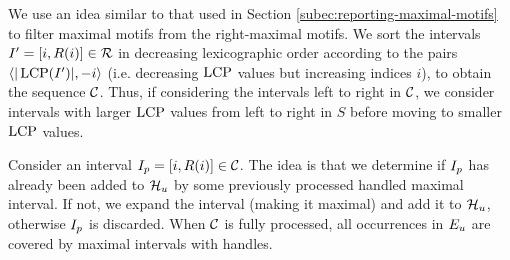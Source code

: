 We use an idea similar to that used in Section \ref{subec:reporting-maximal-motifs} to filter maximal motifs from the right-maximal motifs. 
We sort the intervals $I_{}' = [i, R(i)] \in \mathcal{R}$ in decreasing lexicographic order according to the pairs
$\langle|\operatorname{LCP}(I_{}')|, -i\rangle$ (i.e. decreasing $\operatorname{LCP}$ values but increasing indices $i$), to obtain the sequence $\mathcal{C}$. 
Thus, if considering the intervals left to right in $\mathcal{C}$, we consider intervals with larger $\operatorname{LCP}$ values from left to right in $S$ before moving to smaller $\operatorname{LCP}$ values. 




Consider an interval $I_{p} = [i, R(i)] \in \mathcal{C}$. The idea is that we determine if $I_{p}$ has already been added to $\mathcal{H}_{u}$ by some previously processed handled maximal interval. If not, we expand the interval (making it maximal) and add it to $\mathcal{H}_{u}$, otherwise $I_{p}$ is discarded. When $\mathcal{C}$ is fully processed, all occurrences in $E_{u}$ are covered by maximal intervals with handles.

